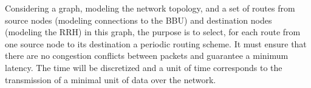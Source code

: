 \documentclass[a4paper,10pt]{article}
\begin{document}

Considering a graph, modeling the network topology, and a set of routes from source nodes (modeling connections to the BBU) and destination nodes (modeling the RRH) in this graph, the purpose is to select, for each route from one source node to its destination a periodic routing scheme. It must ensure that there are no congestion conflicts between packets and guarantee a minimum latency. The time will be discretized and a unit of time corresponds to the transmission of a minimal unit of data over the network. 
\end{document}
